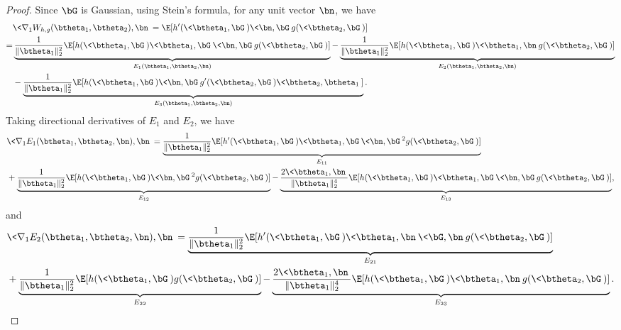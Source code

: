 \documentclass[11pt]{article}
\begin{document}
\begin{proof}
Since $\bG$ is Gaussian, using Stein's formula, for any unit vector $\bn$, we have
\begin{equation}
\begin{aligned}
&\< \nabla_1 W_{h, g}(\btheta_1, \btheta_2), \bn\> = \E[h'(\< \btheta_1, \bG\>) \< \bn, \bG\> g(\<\btheta_2, \bG \>)] \\
=& \underbrace{\frac{1}{\| \btheta_1 \|_2^2} \E[h(\< \btheta_1, \bG\>) \< \btheta_1, \bG\> \< \bn, \bG\> g(\<\btheta_2, \bG \>)]}_{E_{1}(\btheta_1, \btheta_2, \bn)} - \underbrace{\frac{1}{ \| \btheta_1 \|_2^2} \E[h(\< \btheta_1, \bG\>) \< \btheta_1, \bn\>  g(\<\btheta_2, \bG \>)]}_{E_{2}(\btheta_1, \btheta_2, \bn)} \\
&- \underbrace{\frac{1}{ \| \btheta_1 \|_2^2} \E[h(\< \btheta_1, \bG\>) \< \bn, \bG\> g'(\<\btheta_2, \bG \>) \< \btheta_2, \btheta_1\> ]}_{E_{3}(\btheta_1, \btheta_2, \bn)}. 
\end{aligned}
\end{equation}
Taking directional derivatives of $E_1$ and $E_2$, we have
\begin{equation}
\begin{aligned}
&\<\nabla_1 E_{1}(\btheta_1, \btheta_2, \bn), \bn\> = \underbrace{\frac{1}{\| \btheta_1 \|_2^2} \E[h'(\< \btheta_1, \bG\>) \< \btheta_1, \bG\> \< \bn, \bG\>^2 g(\<\btheta_2, \bG \>)]}_{E_{11}}\\
&+ \underbrace{\frac{1}{\| \btheta_1 \|_2^2} \E[h(\< \btheta_1, \bG\>) \< \bn, \bG\>^2 g(\<\btheta_2, \bG \>)]}_{E_{12}} - \underbrace{\frac{2\< \btheta_1, \bn\>}{\| \btheta_1 \|_2^4} \E[h(\< \btheta_1, \bG\>) \< \btheta_1, \bG\> \< \bn, \bG\> g(\<\btheta_2, \bG \>)]}_{E_{13}},
\end{aligned}
\end{equation}
and 
\begin{equation}
\begin{aligned}
&\<\nabla_1 E_{2}(\btheta_1, \btheta_2, \bn), \bn\> = \underbrace{\frac{1}{ \| \btheta_1 \|_2^2} \E[h'(\< \btheta_1, \bG\>) \< \btheta_1, \bn\> \< \bG, \bn\>  g(\<\btheta_2, \bG \>)]}_{E_{21}}\\
&+\underbrace{\frac{1}{ \| \btheta_1 \|_2^2} \E[h(\< \btheta_1, \bG\>) g(\<\btheta_2, \bG \>)]}_{E_{22}} - \underbrace{\frac{2\< \btheta_1, \bn \>}{ \| \btheta_1 \|_2^4} \E[h(\< \btheta_1, \bG\>) \< \btheta_1, \bn\>  g(\<\btheta_2, \bG \>)]}_{E_{23}}.
\end{aligned}
\end{equation}


\end{proof}
\end{document}
